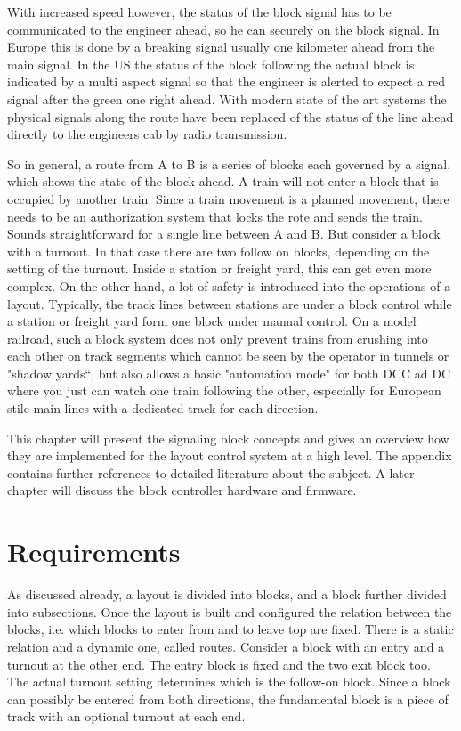With increased speed however, the status of the block signal has to be communicated to the engineer ahead, so he can  securely on the block signal. In Europe this is done by a breaking signal usually one kilometer ahead from the main signal. In the US the status of the block following the actual block is indicated by a multi aspect signal so that the engineer is alerted to expect a red signal after the green one right ahead. With modern state of the art systems the physical signals along the route have been replaced of the status of the line ahead directly to the engineers cab by radio transmission.

So in general, a route from A to B is a series of blocks each governed by a signal, which shows the state of the block ahead. A train will not enter a block that is occupied by another train. Since a train movement is a planned movement, there needs to be an authorization system that locks the rote and sends the train. Sounds straightforward for a single line between A and B. But consider a block with a turnout. In that case there are two follow on blocks, depending on the setting of the turnout. Inside a station or freight yard, this can get even more complex. On the other hand, a lot of safety is introduced into the operations of a layout. Typically, the track lines between stations are under a block control while a station or freight yard form one block under manual control. On a model railroad, such a block system does not only prevent trains from crushing into each other on track segments which cannot be seen by the operator in tunnels or "shadow yards“, but also allows a basic "automation mode" for both DCC ad DC where you just can watch one train following the other, especially for European stile main lines with a dedicated track for each direction.

This chapter will present the signaling block concepts and gives an overview how they are implemented for the layout control system at a high level. The appendix contains further references to detailed literature about the subject. A later chapter will discuss the block controller hardware and firmware.

\section{Requirements}

As discussed already, a layout is divided into blocks, and a block further divided into subsections. Once the layout is built and configured the relation between the blocks, i.e. which blocks to enter from and to leave top are fixed. There is a static relation and a dynamic one, called routes. Consider a block with an entry and a turnout at the other end. The entry block is fixed and the two exit block too. The actual turnout setting determines which is the follow-on block. Since a block can possibly be entered from both directions, the fundamental block is a piece of track with an optional turnout at each end.

